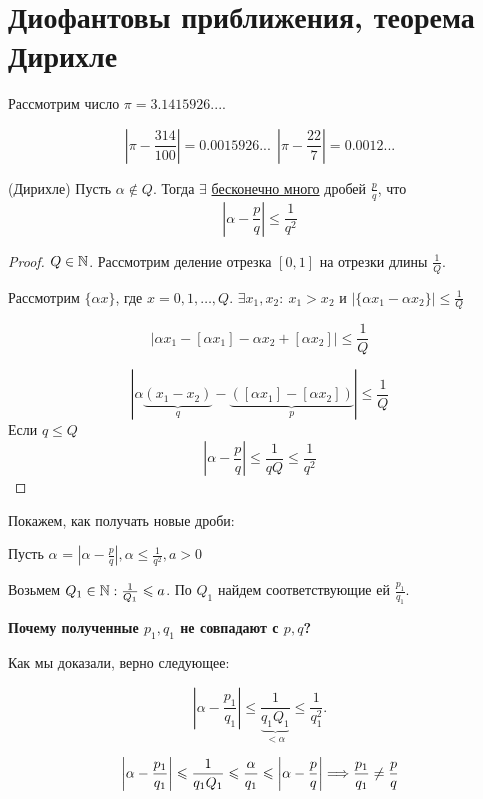 
\section{Диофантовы приближения, теорема Дирихле}

Рассмотрим число $\pi = 3.1415926...$.

$$\left|\pi - \frac{314}{100}\right| = 0.0015926... \ \ \left|\pi - \frac{22}{7}\right| = 0.0012... $$

\begin{theorem}{(Дирихле)}
  Пусть $\alpha \not \in Q$. Тогда $\exists$ \underline{бесконечно много} дробей $\frac{p}{q}$, что $$\left|\alpha - \frac{p}{q}\right| \le \frac{1}{q^2}$$
\end{theorem}

\begin{proof}
  $Q \in \mathbb{N}$. Рассмотрим деление отрезка $[0, 1]$ на отрезки длины $\frac{1}{Q}$.
  
  Рассмотрим $\{\alpha x \}$, где $x = 0, 1,\dots, Q$. $\exists x_1, x_2: \ x_1 > x_2$ и $\left|\{\alpha x_1 - \alpha x_2 \}\right| \le \frac{1}{Q}$

  $$\left|\alpha x_1 - [\alpha x_1] - \alpha x_2 + [\alpha x_2]\right| \le \frac{1}{Q}$$

  $$\left|\alpha \underbrace{(x_1 - x_2)}_{q} - \underbrace{([\alpha x_1] - [\alpha x_2])}_{p}\right| \le \frac{1}{Q}$$
Если $q \le Q$
  $$\left|\alpha - \frac{p}{q}\right| \leq \frac{1}{qQ} \le \frac{1}{q^2}$$ 
\end{proof}

\begin{note}
Покажем, как получать новые дроби:

Пусть $\alpha$ = $\left|\alpha - \frac{p}{q}\right|, \alpha \le \frac{1}{q^2}, a > 0$

Возьмем $Q_1 \in \mathbb{N} : \frac{1}{Q_1} \leqslant a$. По $Q_1$ найдем соответствующие ей $\frac{p_1}{q_1}$.

\textbf{Почему полученные $p_1, q_1$ не совпадают с $p, q$?}

Как мы доказали, верно следующее:

$$\left|\alpha - \frac{p_1}{q_1}\right| \le \frac{1}{\underbrace{q_1 Q_1}_{< \alpha}} \le \frac{1}{q_1^2}.$$

$$\left|\alpha - \frac{p_1}{q_1}\right| \leqslant \frac{1}{q_1 Q_1} \leqslant \frac{\alpha}{q_1} \leqslant \left|\alpha - \frac{p}{q}\right| \Longrightarrow \frac{p_1}{q_1} \ne \frac{p}{q}$$
\end{note}

